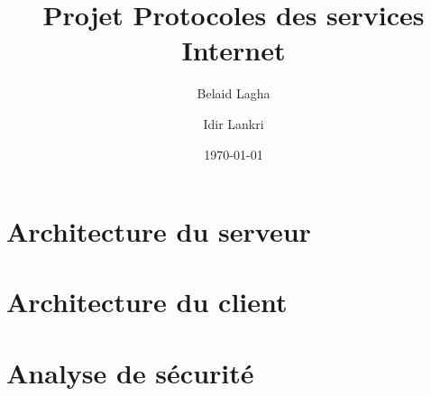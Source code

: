\documentclass[12pt,english,french]{article}
\date{\today{}}
\author{Belaid Lagha \and{} Idir Lankri}
\title{Projet Protocoles des services Internet}
\begin{document}
\maketitle{}

\section{Architecture du serveur}

\section{Architecture du client}

\section{Analyse de sécurité}
\end{document}
